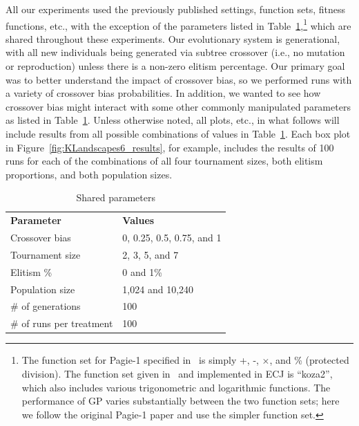 \documentclass{sig-alternate}
\begin{document}
All our experiments used the previously published settings, function sets, fitness functions, etc., with the 
exception of the parameters
listed in Table~\ref{tab:sharedParameters},\footnote{The function set for Pagie-1 specified
in~\cite{pagie1997evolutionary} is simply +, -, $\times$, and \% (protected division). The function set given
in~\cite{mcdermott2012genetic} and implemented in ECJ is ``koza2'', which also includes various trigonometric and
logarithmic functions. The performance of GP varies substantially between the two function sets; here we follow the
original Pagie-1 paper and use the simpler function set.} which are shared throughout these experiments. Our
evolutionary system is generational, with all new individuals being generated via subtree crossover (i.e., no mutation
or reproduction) unless there is a non-zero elitism percentage. Our primary goal was to better understand the impact of
crossover bias, so we performed runs with a variety of crossover bias probabilities. In addition, we wanted to see how
crossover bias might interact with some other commonly manipulated parameters as listed in
Table~\ref{tab:sharedParameters}. Unless otherwise noted, all plots, etc., in what follows will include results from
all possible combinations of values in Table~\ref{tab:sharedParameters}. Each box plot in
Figure~\ref{fig:KLandscapes6_results}, for example, includes the results of 100 runs for each of the combinations of
all four tournament sizes, both elitism proportions, and both population sizes.

\begin{table}[tb]
\begin{center}
\begin{tabular}{ll}
\textbf{Parameter} & \textbf{Values} \\
Crossover bias & 0, 0.25, 0.5, 0.75, and 1 \\
Tournament size & 2, 3, 5, and 7 \\
Elitism \% & 0 and 1\% \\
Population size & 1,024 and 10,240 \\
\# of generations & 100 \\
\# of runs per treatment & 100
\end{tabular}
\end{center}
\vspace{-0.5cm}
\caption{Shared parameters}
\label{tab:sharedParameters}
\end{table}
\end{document}
